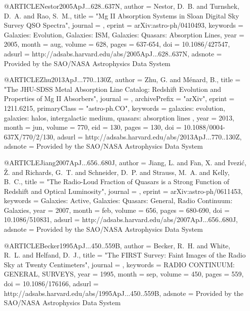 \documentclass[twocolumn]{aastex62}
\begin{document}
{{{{{{{{{{{{{@ARTICLE{Nestor2005ApJ...628..637N,
   author = {{Nestor}, D.~B. and {Turnshek}, D.~A. and {Rao}, S.~M.},
    title = "{Mg II Absorption Systems in Sloan Digital Sky Survey QSO Spectra}",
  journal = {\apj},
   eprint = {arXiv:astro-ph/0410493},
 keywords = {Galaxies: Evolution, Galaxies: ISM, Galaxies: Quasars: Absorption Lines},
     year = 2005,
    month = aug,
   volume = 628,
    pages = {637-654},
      doi = {10.1086/427547},
   adsurl = {http://adsabs.harvard.edu/abs/2005ApJ...628..637N},
  adsnote = {Provided by the SAO/NASA Astrophysics Data System}
}

@ARTICLE{Zhu2013ApJ...770..130Z,
   author = {{Zhu}, G. and {M{\'e}nard}, B.},
    title = "{The JHU-SDSS Metal Absorption Line Catalog: Redshift Evolution and Properties of Mg II Absorbers}",
  journal = {\apj},
archivePrefix = "arXiv",
   eprint = {1211.6215},
 primaryClass = "astro-ph.CO",
 keywords = {galaxies: evolution, galaxies: halos, intergalactic medium, quasars: absorption lines },
     year = 2013,
    month = jun,
   volume = 770,
      eid = {130},
    pages = {130},
      doi = {10.1088/0004-637X/770/2/130},
   adsurl = {http://adsabs.harvard.edu/abs/2013ApJ...770..130Z},
  adsnote = {Provided by the SAO/NASA Astrophysics Data System}
}


@ARTICLE{Jiang2007ApJ...656..680J,
   author = {{Jiang}, L. and {Fan}, X. and {Ivezi{\'c}}, {\v Z}. and {Richards}, G.~T. and 
	{Schneider}, D.~P. and {Strauss}, M.~A. and {Kelly}, B.~C.},
    title = "{The Radio-Loud Fraction of Quasars is a Strong Function of Redshift and Optical Luminosity}",
  journal = {\apj},
   eprint = {arXiv:astro-ph/0611453},
 keywords = {Galaxies: Active, Galaxies: Quasars: General, Radio Continuum: Galaxies},
     year = 2007,
    month = feb,
   volume = 656,
    pages = {680-690},
      doi = {10.1086/510831},
   adsurl = {http://adsabs.harvard.edu/abs/2007ApJ...656..680J},
  adsnote = {Provided by the SAO/NASA Astrophysics Data System}
}



@ARTICLE{Becker1995ApJ...450..559B,
   author = {{Becker}, R.~H. and {White}, R.~L. and {Helfand}, D.~J.},
    title = "{The FIRST Survey: Faint Images of the Radio Sky at Twenty Centimeters}",
  journal = {\apj},
 keywords = {RADIO CONTINUUM: GENERAL, SURVEYS},
     year = 1995,
    month = sep,
   volume = 450,
    pages = {559},
      doi = {10.1086/176166},
   adsurl = {http://adsabs.harvard.edu/abs/1995ApJ...450..559B},
  adsnote = {Provided by the SAO/NASA Astrophysics Data System}
}


}}}}}}}}}}}}}
\end{document}
